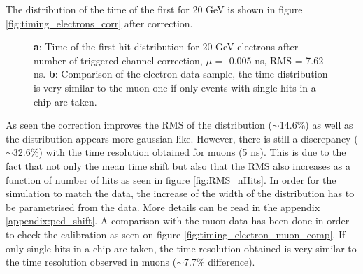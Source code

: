 \documentclass[twoside,a4paper,11pt]{article}
\begin{document}
The distribution of the time of the first for 20 GeV is shown in figure \ref{fig:timing_electrons_corr} after correction.
\begin{figure}[htbp]
	\hfill
	\caption[]{\textbf{a}: Time of the first hit distribution for 20 GeV electrons after number of triggered channel correction, $\mu$ = -0.005 ns, RMS = 7.62 ns. \textbf{b}: Comparison of the electron data sample, the time distribution is very similar to the muon one if only events with single hits in a chip are taken.}
\end{figure}
As seen the correction improves the RMS of the distribution ($\sim$14.6\%) as well as the distribution appears more gaussian-like. However, there is still a discrepancy ($\sim$32.6\%) with the time resolution obtained for muons (5 ns). This is due to the fact that not only the mean time shift but also that the RMS also increases as a function of number of hits as seen in figure \ref{fig:RMS_nHits}. In order for the simulation to match the data, the increase of the width of the distribution has to be parametrised from the data. More details can be read in the appendix \ref{appendix:ped_shift}. A comparison with the muon data has been done in order to check the calibration as seen on figure \ref{fig:timing_electron_muon_comp}. If only single hits in a chip are taken, the time resolution obtained is very similar to the time resolution observed in muons ($\sim$7.7\% difference).\\
\end{document}
